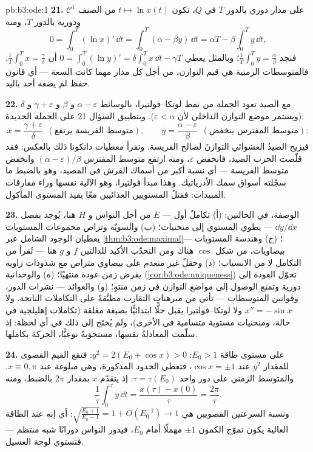 \begin{solution}{pb:b3:ode:1}
\textbf{21.} على مدار دوري بالدور $T$ في $Q$، تكون $t \mapsto \ln
x(t)$ من
الصنف $\mathcal C^1$ ودورية بالدور $T$، ومنه
\[
0 = \int_0^T(\ln x)'\,\dd t
= \int_0^T(\alpha - \beta y)\,\dd t
= \alpha T - \beta\int_0^Ty\,\dd t ,
\]
فنجد $\frac1T\int_0^Ty = \frac\alpha\beta$؛ وبالمثل يعطي $0 =
\int_0^T(\ln y)' = \delta\int_0^Tx\,\dd t - \gamma T$ أن $\frac1T\int_0^Tx = \frac\gamma\delta$. فالمتوسطات
الزمنية هي قيم التوازن، من أجل كل مدار مهما كانت السعة --- أي
قانون حفظ لم يضعه أحد باليد.

\textbf{22.} مع الصيد تعود الجملة من نمط لوتكا--فولتيرا،
بالوسائط $\alpha -
\varepsilon$ و $\beta$ و $\gamma + \varepsilon$ و $\delta$ (ويستمر موضع
التوازن الداخلي لأن $\varepsilon <
\alpha$). وبتطبيق السؤال 21 على الجملة
الجديدة:
\[
\bar x = \frac{\gamma + \varepsilon}{\delta}
\ \ (\text{متوسط الفريسة يرتفع}),
\qquad
\bar y = \frac{\alpha - \varepsilon}{\beta}
\ \ (\text{متوسط المفترس ينخفض}) :
\]
فيزيح الصيدُ العشوائي التوازنَ لصالح الفريسة. وتقرأ معطيات
دانكونا ذلك بالعكس: فقد قلّصت الحرب الصيد، فانخفض $\varepsilon$،
ومنه ارتفع متوسط المفترس $(\alpha - \varepsilon)/\beta$ وانخفض متوسط الفريسة --- أي
نسبة أكبر من أسماك القرش في المصيد، وهو بالضبط ما سجّلته أسواق
سمك الأدرياتيك. وهذا مبدأ فولتيرا، وهو الآلية نفسها وراء
مفارقات المبيدات: فقتلُ المستويين الغذائيين معًا يفيد المستوى
المأكول.

\textbf{23.} الوصفة، في الحالتين: (أ) تكاملٌ أول --- $E$ من أجل
النواس و $H$ هنا، يُوجد بفصل $\dd y/\dd x$ --- يطوي المستوي إلى
منحنيات؛ (ب) والسويّة وتراص مجموعات المستويات يعطيان الوجود
الشامل عبر \cref{thm:b3:ode:maximal}؛ (ج) وهندسة المستويات --- بيضاويات،
من شكل $\cos$ هناك ومن التحدّب الأكيد للدالتين $f$ و $g$ هنا
--- تُقرأ من التكامل لا من الانسياب؛ (د) وحقلٌ غير منعدم على
بيضاوي متراص مع شذوذات زاوية  يفرض زمن عودة
منتهيًا؛ (ه) والوحدانية (\cref{cor:b3:ode:uniqueness}) تحوّل العودة إلى دورية
وتمنع الوصول إلى مواضع التوازن في زمن منتهٍ؛ (و) والعوائد ---
نشرات الدور، وقوانين المتوسطات --- تأتي من مبرهنات التقارب
مطبَّقةً على التكاملات الناتجة. ولا $x'' = -\sin x$ ولا
لوتكا--فولتيرا يقبل حلًّا ابتدائيًّا بصيغة مغلقة (تكاملات
إهليلجية في حالة، ومنحنيات مستوية متسامية في الأخرى)، ولم
يُحتَج إلى ذلك في أي لحظة: إذ سلّمت المعادلةُ نفسها، مستجوَبةً
نوعيًّا، الحركةَ بكاملها.

\textbf{24.} على مستوى طاقة $E_0 > 1$: $y^2 = 2(E_0 +
\cos x) > 0$: فتقع القيم
القصوى للمقدار $y^2$ عند $\cos x = \pm1$، فتعطي الحدود
المذكورة، وهي مبلوغة عند $x \equiv 0, \pi$. والمتوسط الزمني على دور واحد
$\tau = \tau(E_0)$: إذ يتقدّم $x$ بمقدار $2\pi$ بالضبط، ومنه
\[
\frac1\tau\int_0^\tau y\,\dd t = \frac{x(\tau) -
x(0)}{\tau} = \frac{2\pi}\tau .
\]
ونسبة السرعتين القصويين هي $\sqrt{\frac{E_0 + 1}{E_0 -
1}} = 1 + O(E_0^{-1}) \to 1$: أي إنه عند الطاقة العالية
يكون تموّج الكمون $\pm1$ مهملًا أمام $E_0$، فيدور النواس دورانًا
شبه منتظم --- فتستوي لوحة الغسيل.


\end{solution}
